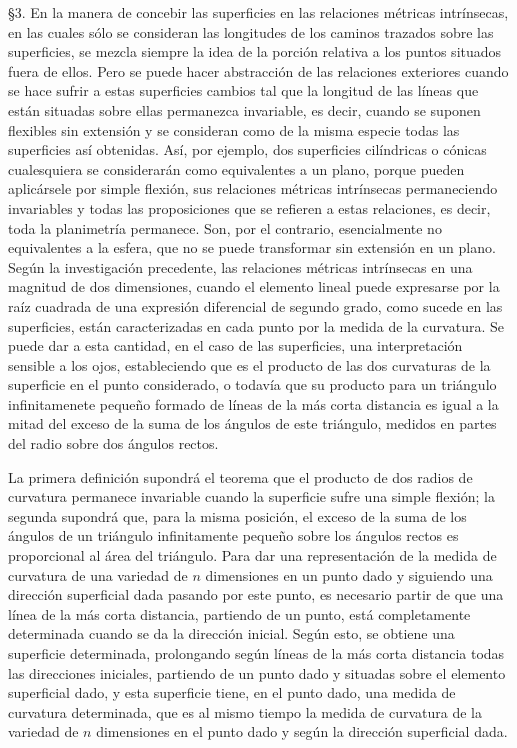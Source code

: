 \documentclass[a4paper, 12pt]{article}
\begin{document}
\bigskip
 
\S  3. \hspace{3 mm} En la manera de concebir las superficies en las relaciones métricas intrínsecas, en las cuales sólo se consideran las longitudes de los caminos trazados sobre las superficies, se mezcla siempre la idea de la porción relativa a los puntos situados fuera de ellos. Pero se puede hacer abstracción de las relaciones exteriores cuando se hace sufrir a estas superficies cambios tal que la longitud de las líneas que están situadas sobre ellas permanezca invariable, es decir, cuando se suponen flexibles sin extensión y se consideran como de la misma especie todas las superficies así obtenidas. Así, por ejemplo, dos superficies cilíndricas o cónicas cualesquiera se considerarán como equivalentes a un plano, porque pueden aplicársele por simple flexión, sus relaciones métricas intrínsecas permaneciendo invariables y todas las proposiciones que se refieren a estas relaciones, es decir, toda la planimetría permanece. Son, por el contrario, esencialmente no equivalentes a la esfera, que no se puede transformar sin extensión
en un plano. Según la investigación precedente, las relaciones métricas intrínsecas en una magnitud de dos dimensiones, cuando el elemento lineal puede expresarse por la raíz cuadrada de una expresión diferencial de segundo grado, como sucede en las superficies, están caracterizadas en cada punto por la medida de la curvatura. Se puede dar a esta cantidad, en el caso de las superficies, una interpretación sensible a los ojos, estableciendo que es el producto de las dos curvaturas de la superficie en el punto considerado, o todavía que su producto para un triángulo infinitamenete pequeño formado de líneas de la más corta distancia es igual a la mitad del exceso de la suma de los ángulos de este
triángulo, medidos en partes del radio sobre dos ángulos rectos.

La primera definición supondrá el teorema que el producto de dos radios de curvatura permanece invariable cuando la superficie sufre una simple flexión; la segunda supondrá que, para la misma posición, el exceso de la suma de los ángulos de un triángulo infinitamente pequeño sobre los ángulos rectos es proporcional al área del triángulo. Para dar una representación de la medida de curvatura de una variedad de $n$ dimensiones en un punto dado y siguiendo una dirección superficial dada pasando por este punto, es necesario partir de que una línea de la más corta distancia, partiendo de un punto, está completamente determinada cuando se da la dirección inicial. Según esto, se obtiene una superficie determinada, prolongando según líneas de la más corta distancia todas las direcciones iniciales, partiendo de un punto dado y situadas sobre el elemento superficial dado, y esta superficie tiene, en el punto dado, una medida de curvatura determinada, que es al mismo tiempo la medida de curvatura de la variedad de $n$ dimensiones en el punto dado y según la dirección superficial dada.
\end{document}
